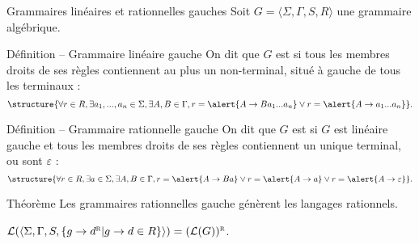 
\begingroup

\begin{frame}{Grammaires linéaires et rationnelles gauches}
  Soit \alert{$G = \langle \Sigma, \Gamma, S, R \rangle$} une grammaire algébrique. 

  \begin{block}{Définition -- Grammaire linéaire gauche}
    On dit que $G$ est  si tous les membres droits de ses règles
    contiennent au plus un non-terminal, situé à gauche de tous les terminaux :
    {\small $$
      \structure{\forall r\in R, \exists a_1, ..., a_n \in \Sigma, \exists A, B \in \Gamma, r = \alert{A \rightarrow B a_1 ... a_n} \lor r = \alert{A \rightarrow a_1 ... a_n}}.
      $$}
  \end{block}
  
  \vspace{-2mm}
  \begin{block}{Définition -- Grammaire rationnelle gauche}
    On dit que $G$ est  si $G$ est linéaire gauche et tous les membres droits de ses règles
    contiennent un unique terminal, ou sont $\varepsilon$ :
    {\small $$
      \structure{\forall r\in R, \exists a \in \Sigma, \exists A, B \in \Gamma, r = \alert{A \rightarrow B a} \lor r = \alert{A \rightarrow a} \lor r = \alert{A \rightarrow \varepsilon}}.
      $$}
  \end{block}
  
  \vspace{-2mm}
  \begin{block}{Théorème}
    Les grammaires rationnelles gauche génèrent les langages rationnels.
    
     $\mathcal{L}(\langle \Sigma, \Gamma, S, \{ g \rightarrow d^{\textsc{r}} | g \rightarrow d \in R\} \rangle) = (\mathcal{L}(G))^{\textsc{r}}$.
  \end{block}
\end{frame}

\endgroup

